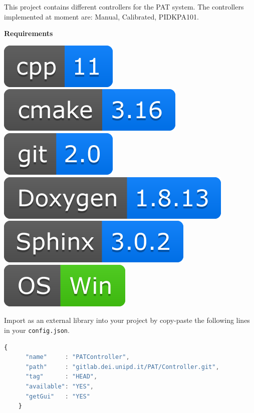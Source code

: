 
This project contains different controllers for the PAT system. The
controllers implemented at moment are: Manual, Calibrated, PIDKPA101.

\textbf{Requirements}

\includegraphics[scale=0.7]{img/shilds/cpp.png}
\includegraphics[scale=0.7]{img/shilds/cmake.png}
\includegraphics[scale=0.7]{img/shilds/git.png}
\includegraphics[scale=0.7]{img/shilds/doxygen.png}
\includegraphics[scale=0.7]{img/shilds/sphinx.png}
\includegraphics[scale=0.7]{img/shilds/win.png}



Import as an external library into your project by copy-paste the
following lines in your \texttt{config.json}.

\begin{lstlisting}[language=javascript, gobble=2]
    {
      "name"     : "PATController",
      "path"     : "gitlab.dei.unipd.it/PAT/Controller.git",
      "tag"      : "HEAD",
      "available": "YES",
      "getGui"   : "YES"
    }
\end{lstlisting}

